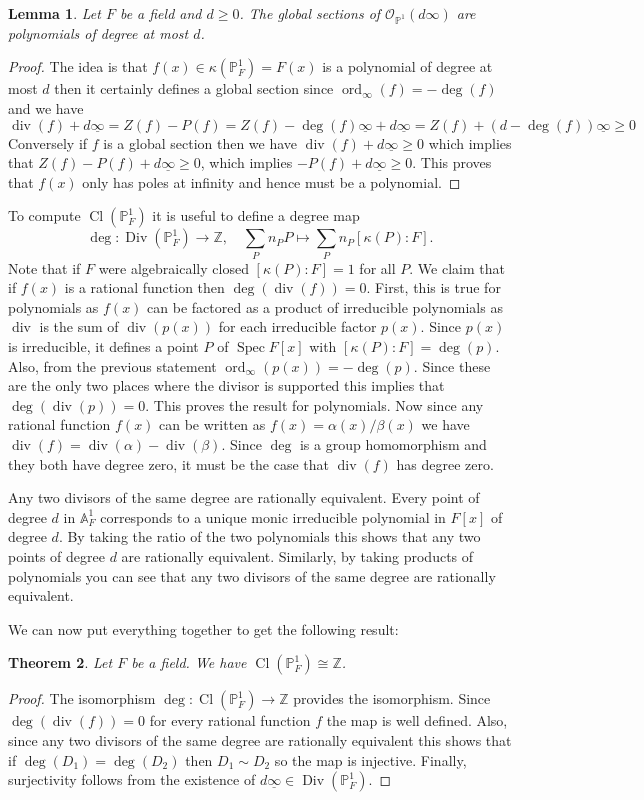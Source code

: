 \documentclass[12pt]{article}
\numberwithin{equation}{section}
\newtheorem{theorem}{Theorem}[subsection]
\newtheorem{lemma}[theorem]{Lemma}
\theoremstyle{definition}
\theoremstyle{remark}
\newcommand{\ZZ}{\mathbb{Z}}
\newcommand{\Ocal}{\mathcal{O}}
\newcommand{\PP}{\mathbb{P}}
\renewcommand{\AA}{\mathbb{A}}
\newcommand{\Spec}{\operatorname{Spec}}
\newcommand{\ord}{\operatorname{ord}}
\newcommand{\Div}{\operatorname{Div}}
\renewcommand{\div}{\operatorname{div}}
\newcommand{\Cl}{\operatorname{Cl}}
\begin{document}
\begin{lemma}
	Let $F$ be a field and $d\geq 0$. The global sections of $\Ocal_{\PP^1}(d\infty)$ are polynomials of degree at most $d$.
\end{lemma}
\begin{proof}
	The idea is that $f(x) \in \kappa(\PP^1_F) = F(x)$ is a polynomial of degree at most $d$ then it certainly defines a global section since $\ord_{\infty}(f) = -\deg(f)$ and we have 
	 $$ \div(f) + d\underline{\infty}= Z(f) - P(f) = Z(f) - \deg(f) \underline{\infty} + d \underline{\infty} = Z(f) + (d-\deg(f))\underline{\infty} \geq 0$$
	Conversely if $f$ is a global section then we have $\div(f) + d\underline{\infty} \geq 0$ which implies that $Z(f) - P(f) + d \underline{\infty}\geq 0$, which implies $-P(f)+d \underline{\infty}\geq 0$.
	This proves that $f(x)$ only has poles at infinity and hence must be a polynomial.  
\end{proof}

To compute $\Cl(\PP^1_F)$ it is useful to define a degree map 
 $$ \deg: \Div(\PP^1_F) \to \ZZ, \quad \sum_P n_P P \mapsto \sum_P n_P[\kappa(P):F]. $$
Note that if $F$ were algebraically closed $[\kappa(P):F]=1$ for all $P$.
We claim that if $f(x)$ is a rational function then $\deg(\div(f))=0$.
First, this is true for polynomials as $f(x)$ can be factored as a product of irreducible polynomials as $\div$ is the sum of $\div(p(x))$ for each irreducible factor $p(x)$. 
Since $p(x)$ is irreducible, it defines a point $P$ of $\Spec F[x]$ with $[\kappa(P):F]=\deg(p)$. 
Also, from the previous statement $\ord_{\infty}(p(x)) = -\deg(p)$. 
Since these are the only two places where the divisor is supported this implies that $\deg(\div(p))=0$. 
This proves the result for polynomials. 
Now since any rational function $f(x)$ can be written as $f(x) = \alpha(x)/\beta(x)$ we have $\div(f) = \div(\alpha)-\div(\beta)$. 
Since $\deg$ is a group homomorphism and they both have degree zero, it must be the case that $\div(f)$ has degree zero.

Any two divisors of the same degree are rationally equivalent. 
Every point of degree $d$ in $\AA^1_F$ corresponds to a unique monic irreducible polynomial in $F[x]$ of degree $d$. 
By taking the ratio of the two polynomials this shows that any two points of degree $d$ are rationally equivalent. 
Similarly, by taking products of polynomials you can see that any two divisors of the same degree are rationally equivalent.
 
We can now put everything together to get the following result:
\begin{theorem}
	Let $F$ be a field. We have $\Cl(\PP^1_F)\cong \ZZ$.
\end{theorem}
\begin{proof}
	The isomorphism $\deg: \Cl(\PP^1_F) \to \ZZ$ provides the isomorphism. 
	Since $\deg(\div(f))=0$ for every rational function $f$ the map is well defined. 
	Also, since any two divisors of the same degree are rationally equivalent this shows that if $\deg(D_1)=\deg(D_2)$ then $D_1\sim D_2$ so the map is injective. 
	Finally, surjectivity follows from the existence of $d \underline{\infty} \in \Div(\PP^1_F)$. 
\end{proof}
\end{document}
